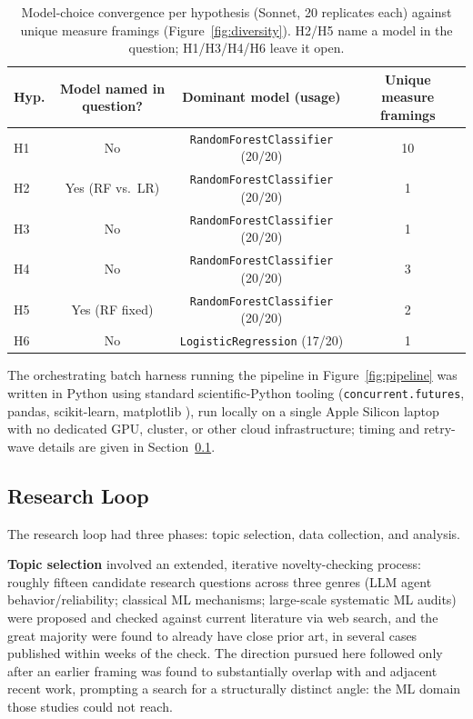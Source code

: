 \documentclass{article}
\begin{document}
\begin{table}[h]
  \caption{Model-choice convergence per hypothesis (Sonnet, 20 replicates each) against
  unique measure framings (Figure~\ref{fig:diversity}). H2/H5 name a model in the
  question; H1/H3/H4/H6 leave it open.}
  \label{tab:toolvsmethod}
  \centering
  \footnotesize
  \renewcommand{\arraystretch}{0.82}
  \begin{tabular}{lccc}
    \toprule
    Hyp. & Model named in question? & Dominant model (usage) & Unique measure framings \\
    \midrule
    H1 & No & \texttt{RandomForestClassifier} (20/20) & 10 \\
    H2 & Yes (RF vs.\ LR) & \texttt{RandomForestClassifier} (20/20) & 1 \\
    H3 & No & \texttt{RandomForestClassifier} (20/20) & 1 \\
    H4 & No & \texttt{RandomForestClassifier} (20/20) & 3 \\
    H5 & Yes (RF fixed) & \texttt{RandomForestClassifier} (20/20) & 2 \\
    H6 & No & \texttt{LogisticRegression} (17/20) & 1 \\
    \bottomrule
  \end{tabular}
\end{table}

The orchestrating batch harness running the pipeline in
Figure~\ref{fig:pipeline} was written in Python using standard scientific-Python tooling
(\texttt{concurrent.futures}, pandas, scikit-learn, matplotlib \citep{hunter2007}), run
locally on a single
Apple Silicon laptop with no dedicated GPU, cluster, or other cloud infrastructure; timing
and retry-wave details are given in Section~\ref{sec:research-loop}.

\subsection{Research Loop}
\label{sec:research-loop}

The research loop had three phases: topic selection, data collection, and analysis.

\textbf{Topic selection} involved an extended, iterative novelty-checking process: roughly
fifteen candidate research questions across three genres (LLM agent behavior/reliability;
classical ML mechanisms; large-scale systematic ML audits) were proposed and checked
against current literature via web search, and the great majority were found to already
have close prior art, in several cases published within weeks of the check. The direction
pursued here followed only after an earlier framing was found to substantially overlap
with \citet{gaoxiao2026} and adjacent recent work, prompting a search for a structurally
distinct angle: the ML domain those studies could not reach.
\end{document}
